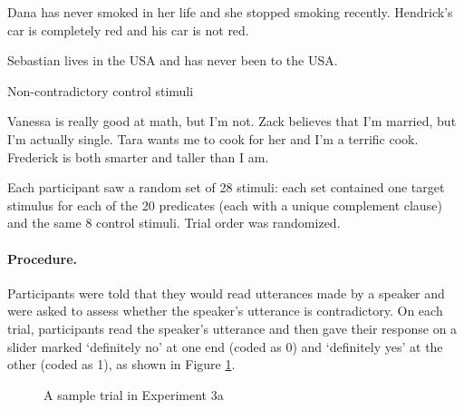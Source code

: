 \documentclass[11pt,fleqn]{article}
\newcommand{\6}{\mbox{$[\hspace*{-.6mm}[$}}
\newcommand{\9}{\mbox{$]\hspace*{-.6mm}]$}}
\begin{document}
{\begin{exe}
\begin{xlist}
\ex Dana has never smoked in her life and she stopped smoking recently.
\ex Hendrick's car is completely red and his car is not red.

\ex Sebastian lives in the USA and has never been to the USA.
\end{xlist}

\ex\label{control-good} Non-contradictory control stimuli
\begin{xlist}
\ex Vanessa is really good at math, but I'm not.
\ex Zack believes that I'm married, but I'm actually single.
\ex Tara wants me to cook for her and I'm a terrific cook.
\ex Frederick is both smarter and taller than I am.

\end{xlist}

\end{exe}

Each participant saw a random set of 28 stimuli: each set contained one target stimulus for each of the 20 predicates (each with a unique complement clause) and the same 8 control stimuli. Trial order was randomized.


\paragraph{Procedure.} Participants were told that they would read utterances made by a speaker and were asked to assess whether the speaker's utterance is contradictory. On each trial, participants read the speaker's utterance and then gave their response on a slider marked `definitely no' at one end (coded as 0) and `definitely yes' at the other (coded as 1), as shown in Figure \ref{f-trial-exp2}.

\begin{figure}[h!]
\begin{center}
\end{center}
\caption{A sample trial in Experiment 3a}\label{f-trial-exp2}
\end{figure}

}
\end{document}
